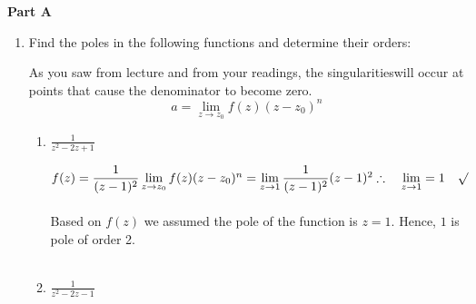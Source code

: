 \documentclass[fleqn]{article}
\begin{document}
  \textbf{Part A}
  \begin{enumerate}

    \item Find the poles in the following functions and determine their orders:
    
      \textcolor{hwColor}{
        As you saw from lecture and from your readings, the singularitieswill occur at points that cause the 
        denominator to become zero.
        $$a=\lim\limits_{z \to z_0} f(z) (z-z_0)^n$$  
      }

      \begin{enumerate}
        \item  $\frac{1}{z^2 - 2z + 1}$ 

          \textcolor{hwColor}{
            $
              f(z)=\dfrac{1}{(z-1)^2} \\
              \\
              \\
              \lim\limits_{z \to z_0} f(z) (z-z_0)^n=\lim\limits_{z \to 1} \dfrac{1}{(z-1)^2} (z-1)^2 \\
              \\
              \\
              \therefore ~~~ \lim\limits_{z \to 1}=1 ~~~ \surd
            $ \\ \\
            Based on $f(z)$ we assumed the pole of the function is $z=1$. Hence, $1$ is pole of order 2. \\ \\
          }

        \item  $\frac{1}{z^2 - 2z - 1}$ 


\end{enumerate}
\end{enumerate}
\end{document}
